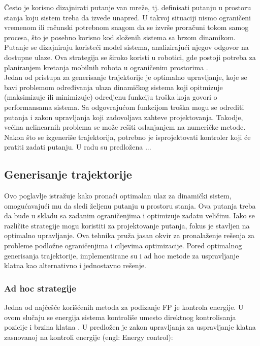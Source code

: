 \documentclass[a4paper,11pt]{article}
\theoremstyle{definition} \newtheorem{deff}{Definicija}[section]
\theoremstyle{definition} \newtheorem{prim}[deff]{Primer}
\theoremstyle{plain} \newtheorem{teor}[deff]{Teorema}
\begin{document}
	Često je korisno dizajnirati putanje van mreže, tj. definisati putanju u prostoru stanja koju sistem treba da izvede unapred. U takvoj situaciji nismo ograničeni vremenom ili računski potrebnom snagom da se izvrše proračuni tokom samog procesa, što je posebno korisno kod složenih sistema sa brzom dinamikom. Putanje se dizajniraju koristeći model sistema, analizirajući njegov odgovor na dostupne ulaze. Ova strategija se široko koristi u robotici, gde postoji potreba za planiranjem kretanja mobilnih robota u ograničenim prostorima \cite{inicijalna}. \\
	
	Jedan od pristupa za generisanje trajektorije je optimalno upravljanje,  koje se bavi problemom određivanja ulaza dinamičkog sistema koji opitmizuje (maksimizuje ili minimizuje) odredjenu funkciju troška koja govori o performansama sistema. Sa odgovrajućom funkcijom troška mogu se odrediti putanja i zakon upravljanja koji zadovoljava zahteve projektovanja. Takodje, većina nelinearnih problema se može rešiti oslanjanjem na numeričke metode. \\
	
	Nakon što se izgeneriše trajektorija, potrebno je isprojektovati kontroler koji će pratiti zadati putanju. U radu \cite{inicijalna} su predložena ...
	
	
	
	
	\newpage
	\subsection{Generisanje trajektorije}
	
	Ovo poglavlje istražuje kako pronaći optimalan ulaz za dinamički sistem, omogućavajući mu da sledi željenu putanju u prostoru stanja. Ova putanja treba da bude u skladu sa zadanim ograničenjima i optimizuje zadatu veličinu. Iako se različite strategije mogu koristiti za projektovanje putanja, fokus je stavljen na optimalno upravljanje. Ova tehnika pruža jasan okvir za pronalaženje rešenja za probleme podložne ograničenjima i ciljevima optimizacije. Pored optimalnog generisanja trajektorije, implementirane su i ad hoc metode za uspravljanje klatna kao alternativno i jednostavno rešenje. 
	
	\subsubsection{Ad hoc strategije}
	\label{sec:andhoc}
	
	Jedna od najčešće korišćenih metoda za podizanje FP je kontrola energije. U ovom slučaju se energija sistema kontroliše umesto direktnog kontrolisanja pozicije i brzina klatna \cite{inicijalna}.
	U \cite{energy_c} predložen je zakon upravljanja za uspravljanje klatna zasnovanoj na kontroli energije (engl: Energy control): \\
	
\end{document}
